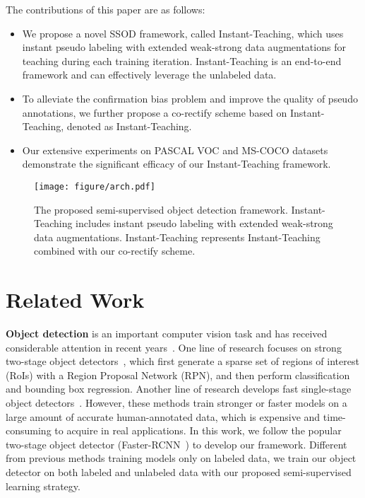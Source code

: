 \documentclass[final]{cvpr}
\begin{document}
The contributions of this paper are as follows:
\begin{itemize}

\item We propose a novel SSOD framework, called Instant-Teaching, which uses instant pseudo labeling with extended weak-strong data augmentations for teaching during each training iteration. Instant-Teaching is an end-to-end framework and can effectively leverage the unlabeled data.

\item To alleviate the confirmation bias problem and improve the quality of pseudo annotations, we further propose a co-rectify scheme based on Instant-Teaching, denoted as Instant-Teaching.

\item Our extensive experiments on PASCAL VOC and MS-COCO datasets demonstrate the significant efficacy of our Instant-Teaching framework. 
\end{itemize}



\begin{figure*}[t!]
	\begin{center}
	\texttt{[image: figure/arch.pdf]}
	\end{center}
	\vspace{-.1in}
	\caption{The proposed semi-supervised object detection framework. Instant-Teaching includes instant pseudo labeling with extended weak-strong data augmentations. Instant-Teaching represents Instant-Teaching combined with our co-rectify scheme.}
	\label{fig:ssl_framework}
	\vspace{-.1in}
\end{figure*}

\section{Related Work}
\noindent \textbf{Object detection} is an important computer vision task and has received considerable attention in recent years~\cite{girshick2014rich,girshick2015fast,ren2015faster,he2017mask,lin2017feature,cai2018cascade,hu2018relation,liu2016ssd,redmon2016you,lin2017focal}. One line of research focuses on strong two-stage object detectors~\cite{girshick2014rich,girshick2015fast,ren2015faster,dai2016r,he2017mask,lin2017feature,cai2018cascade,hu2018relation}, which first generate a sparse set of regions of interest (RoIs) with a Region Proposal Network (RPN), and then perform classification and bounding box regression. Another line of research develops fast single-stage object detectors~\cite{liu2016ssd,redmon2016you,lin2017focal,law2018cornernet,duan2019centernet,tian2019fcos}. However,
these methods train stronger or faster models on a large amount of accurate human-annotated data, which is expensive and time-consuming to acquire in real applications. In this work, we follow the popular two-stage object detector (Faster-RCNN~\cite{ren2015faster}) to develop our framework. Different from previous methods training models only on labeled data, we train our object detector on both labeled and unlabeled data with our proposed semi-supervised learning strategy.
\end{document}
